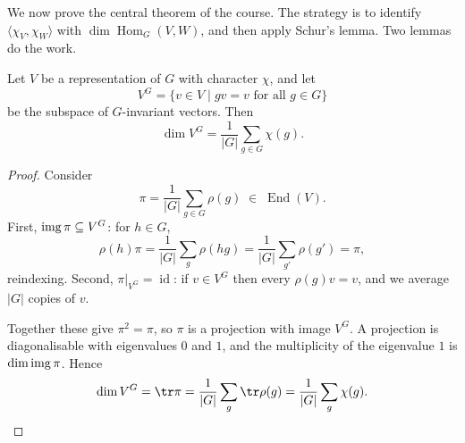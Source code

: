 \documentclass[a4paper]{scrartcl}
\newcommand{\Hom}{\operatorname{Hom}}
\newcommand{\End}{\operatorname{End}}
\newcommand{\id}{\operatorname{id}}
\newcommand{\ip}[2]{\langle #1, #2 \rangle}
\begin{document}
We now prove the central theorem of the course. The strategy is to identify $\ip{\chi_V}{\chi_W}$ with $\dim \Hom_G(V,W)$, and then apply Schur's lemma. Two lemmas do the work.

\begin{lemma}
	Let $V$ be a representation of $G$ with character $\chi$, and let
	$$V^G = \{ v \in V \mid gv = v \text{ for all } g \in G\}$$
	be the subspace of $G$-invariant vectors. Then
	$$\dim V^G = \frac{1}{|G|}\sum_{g\in G}\chi(g).$$
\end{lemma}
\begin{proof}
	Consider
	$$\pi = \frac1{|G|}\sum_{g \in G}\rho(g) \; \in \; \End(V).$$
	First, $\operatorname{img} \pi \subseteq V^G$: for $h \in G$,
	$$\rho(h)\pi = \frac1{|G|}\sum_{g}\rho(hg) = \frac1{|G|}\sum_{g'}\rho(g') = \pi,$$
	reindexing. Second, $\pi|_{V^G} = \id$: if $v \in V^G$ then every $\rho(g)v = v$, and we average $|G|$ copies of $v$.

	Together these give $\pi^2 = \pi$, so $\pi$ is a projection with image $V^G$. A projection is diagonalisable with eigenvalues $0$ and $1$, and the multiplicity of the eigenvalue $1$ is $\dim \operatorname{img} \pi$. Hence
	$$\dim V^G = \tr \pi = \frac1{|G|}\sum_g \tr\rho(g) = \frac1{|G|}\sum_g \chi(g). \qedhere$$
\end{proof}
\end{document}
